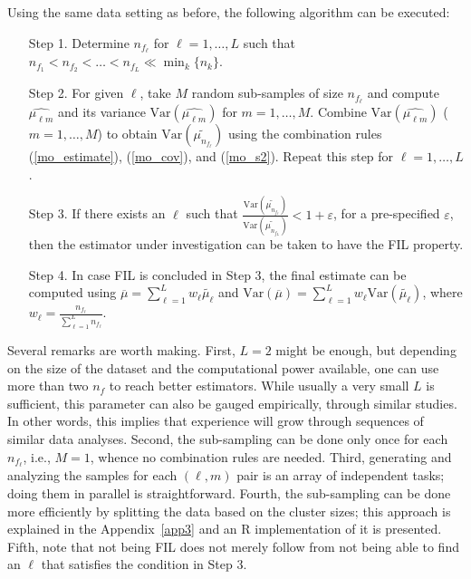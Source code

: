 \documentclass[11pt,a5paper,twoside]{book}
\begin{document}
Using the same data setting as before, the following algorithm can be executed:
\begin{enumerate}
\item[Step 1.] Determine $n_{f_\ell}$ for $\ell=1,\ldots,L$ such that $n_{f_1} < n_{f_2}<\ldots< n_{f_L} \ll \min_k\{n_k\}$.
\item[Step 2.] For given $\ell$, take $M$ random sub-samples of size $n_{f_\ell}$ and compute $\widehat{\mu_{\ell m}}$ and its variance $\mathrm{Var}(\widehat{\mu_{\ell m}})$ for $m=1,\ldots,M$. Combine $\mathrm{Var}(\widehat{\mu_{\ell m}})$ ($m=1,\ldots,M$) to obtain $\mathrm{Var}(\widetilde{\mu_{n_{f_\ell}}})$ using the combination rules (\ref{mo_estimate}), (\ref{mo_cov}), and (\ref{mo_s2}). Repeat this step for $\ell=1,\ldots,L$.
\item[Step 3.] If there exists an $\ell$ such that $\frac{\mathrm{Var}(\widetilde{\mu_{n_{f_{\ell}}}})}{\mathrm{Var}(\widetilde{\mu_{n_{f_L}}})} < 1+\varepsilon$, for a pre-specified $\varepsilon$, then the estimator under investigation can be taken to have the FIL property.
\item[Step 4.] In case FIL is concluded in Step 3, the final estimate can be computed using $\overline{\mu}=\sum_{\ell=1}^L w_\ell \widetilde{\mu_\ell}$ and $\mathrm{Var}(\overline{\mu}) = \sum_{\ell=1}^L w_\ell \mathrm{Var}(\widetilde{\mu_\ell})$, where $w_\ell = \frac{n_{f_\ell}}{\sum_{\ell=1}^L n_{f_\ell}}$.
\end{enumerate}
Several remarks are worth making. First, $L=2$ might be enough, but depending on the size of the dataset and the computational power available, one can use more than two $n_f$ to reach better estimators. While usually a very small $L$ is sufficient, this parameter can also be gauged empirically, through similar studies. In other words, this implies that experience will grow through sequences of similar data analyses. Second, the sub-sampling can be done only once for each $n_{f_\ell}$, i.e., $M=1$, whence no combination rules are needed. Third, generating and analyzing the samples for each $(\ell,m)$ pair is an array of independent tasks; doing them in parallel is straightforward. Fourth, the sub-sampling can be done more efficiently by splitting the data based on the cluster sizes; this approach is explained in the Appendix~\ref{app3} and an \textsf{R} implementation of it is presented. Fifth, note that not being FIL does not merely follow from not being able to find an $\ell$ that satisfies the condition in Step 3.
\end{document}
